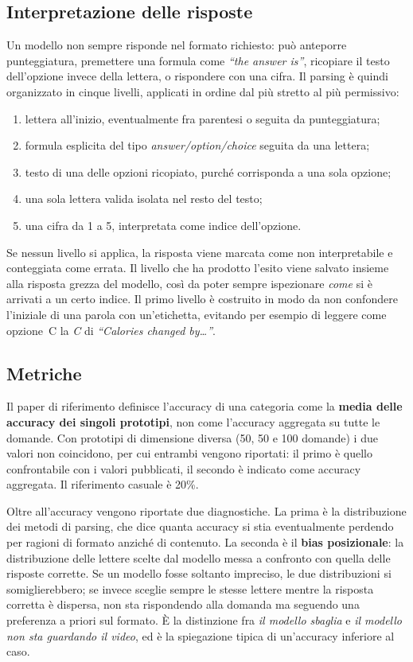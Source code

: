 \documentclass{article}
\begin{document}
\subsection{Interpretazione delle risposte}

Un modello non sempre risponde nel formato richiesto: può anteporre
punteggiatura, premettere una formula come \emph{``the answer is''}, ricopiare il
testo dell'opzione invece della lettera, o rispondere con una cifra. Il parsing è
quindi organizzato in cinque livelli, applicati in ordine dal più stretto al più
permissivo:

\begin{enumerate}\itemsep2pt
  \item lettera all'inizio, eventualmente fra parentesi o seguita da
        punteggiatura;
  \item formula esplicita del tipo \emph{answer/option/choice} seguita da una
        lettera;
  \item testo di una delle opzioni ricopiato, purché corrisponda a una sola
        opzione;
  \item una sola lettera valida isolata nel resto del testo;
  \item una cifra da 1 a 5, interpretata come indice dell'opzione.
\end{enumerate}

Se nessun livello si applica, la risposta viene marcata come non interpretabile e
conteggiata come errata. Il livello che ha prodotto l'esito viene salvato insieme
alla risposta grezza del modello, così da poter sempre ispezionare \emph{come} si
è arrivati a un certo indice. Il primo livello è costruito in modo da non
confondere l'iniziale di una parola con un'etichetta, evitando per esempio di
leggere come opzione~C la \emph{C} di \emph{``Calories changed by\ldots''}.

\subsection{Metriche}

Il paper di riferimento definisce l'accuracy di una categoria come la
\textbf{media delle accuracy dei singoli prototipi}, non come l'accuracy
aggregata su tutte le domande. Con prototipi di dimensione diversa (50, 50 e 100
domande) i due valori non coincidono, per cui entrambi vengono riportati: il
primo è quello confrontabile con i valori pubblicati, il secondo è indicato come
accuracy aggregata. Il riferimento casuale è 20\%.

Oltre all'accuracy vengono riportate due diagnostiche. La prima è la
distribuzione dei metodi di parsing, che dice quanta accuracy si stia
eventualmente perdendo per ragioni di formato anziché di contenuto. La seconda è
il \textbf{bias posizionale}: la distribuzione delle lettere scelte dal modello
messa a confronto con quella delle risposte corrette. Se un modello fosse
soltanto impreciso, le due distribuzioni si somiglierebbero; se invece sceglie sempre le stesse lettere mentre la risposta corretta è dispersa, non sta
rispondendo alla domanda ma seguendo una preferenza a priori sul formato. È la
distinzione fra \emph{il modello sbaglia} e \emph{il modello non sta guardando il
video}, ed è la spiegazione tipica di un'accuracy inferiore al caso.
\end{document}

